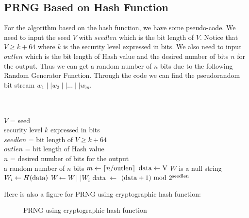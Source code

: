 \documentclass[12pt,a4paper,oneside]{report}
\begin{document}
\subsection{PRNG Based on Hash Function}
For the algorithm based on the hash function, we have some pseudo-code. We need to input the seed $V$ with $seedlen$ which is the bit length of $V$. Notice that $V \geq k+64$ where $k$ is the security level expressed in bits. We also need to input $outlen$ which is the bit length of Hash value and the desired number of bits $n$ for the output. Thus we can get a random number of $n$ bits due to the following  Random Generator Function. Through the code we can find the pseudorandom bit stream $w_1 \mid \mid w_2 \mid \mid ... \mid \mid w_m$.\\
\\
\begin{algorithm}
    \begin{algorithmic}
        \Require \\
        $V$ = seed\\
        security level $k$ expressed in bits\\
        $seedlen$ = bit length of $V \geq k+64$\\
        $outlen$ = bit length of Hash value\\
        $n$ = desired number of bits for the output
        \Ensure \\
        a random number of $n$ bits
                \State $m \gets \lceil n/\rm{outlen} \rceil$ 
                \State $\rm{data} \gets V$ 
                \State $W$ is a null string
                    \State $W_i \gets H(\rm{data})$  
                    \State $W \gets W \mid\mid W_i$  
                    \State data $\gets$ $(\rm{data}+1) \rm{\ mod\ } 2^{\rm{seedlen}}$ 
                \EndFor
                \State {}  
        \EndFunction  
    \end{algorithmic}  
\end{algorithm}

Here is also a figure for PRNG using cryptographic hash function:

\begin{figure}[H]
    \centering
    \caption{PRNG using cryptographic hash function}
    \label{fig:1}
\end{figure}
\end{document}
